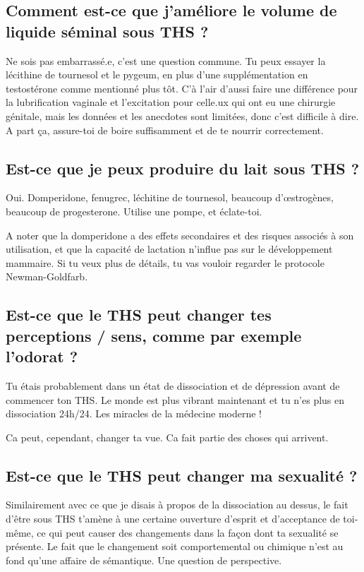 \documentclass{article}
\begin{document}
\subsection{Comment est-ce que j'améliore le volume de liquide séminal sous THS ?}

Ne sois pas embarrassé.e, c'est une question commune. Tu peux essayer la lécithine de tournesol et le pygeum, en plus d'une supplémentation en testostérone comme mentionné plus tôt. C'à l'air d'aussi faire une différence pour la lubrification vaginale et l'excitation pour celle.ux qui ont eu une chirurgie génitale, mais les données et les anecdotes sont limitées, donc c'est difficile à dire. A part ça, assure-toi de boire suffisamment et de te nourrir correctement.

\subsection{Est-ce que je peux produire du lait sous THS ?}

Oui. Domperidone, fenugrec, léchitine de tournesol, beaucoup d'œstrogènes, beaucoup de progesterone. Utilise une pompe, et éclate-toi.

A noter que la domperidone a des effets secondaires et des risques associés à son utilisation, et que la capacité de lactation n'influe pas sur le développement mammaire. Si tu veux plus de détails, tu vas vouloir regarder le protocole Newman-Goldfarb.

\subsection{Est-ce que le THS peut changer tes perceptions / sens, comme par exemple l'odorat ?}

Tu étais probablement dans un état de dissociation et de dépression avant de commencer ton THS. Le monde est plus vibrant maintenant et tu n'es plus en dissociation 24h/24. Les miracles de la médecine moderne !

Ca peut, cependant, changer ta vue. Ca fait partie des choses qui arrivent.

\subsection{Est-ce que le THS peut changer ma sexualité ?}

Similairement avec ce que je disais à propos de la dissociation au dessus, le fait d'être sous THS t'amène à une certaine ouverture d'esprit et d'acceptance de toi-même, ce qui peut causer des changements dans la façon dont ta sexualité se présente. Le fait que le changement soit comportemental ou chimique n'est au fond qu'une affaire de sémantique. Une question de perspective.
\end{document}
